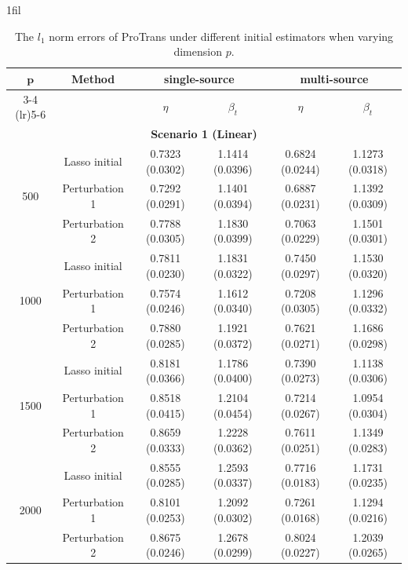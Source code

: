 \documentclass[12pt]{article}
\makeatletter
\newcommand*{\centerfloat}{%
  \parindent \z@
  \leftskip \z@ \@plus 1fil \@minus \marginparwidth
  \rightskip \leftskip
  \parfillskip \z@skip}
\makeatother
\begin{document}
\begin{table}[!ht]
\renewcommand{\arraystretch}{0.6}
\footnotesize
\centerfloat
\caption{The $l_1$ norm errors of ProTrans under different initial estimators when varying dimension $p$.}
\label{tab:our_only_vary_p_l1}
    \begin{tabular}{cccccc}
        \toprule
        \multirow{2}{*}{$\bm{p}$} & \multirow{2}{*}{\textbf{Method}} & \multicolumn{2}{c}{\textbf{single-source}} & \multicolumn{2}{c}{\textbf{multi-source}}\\
        \cmidrule(lr){3-4} \cmidrule(lr){5-6} 
        & & $\eta$ & $\beta_{t}$ & $\eta$& $\beta_{t}$ \\
        \midrule
        \multicolumn{6}{c}{\textbf{Scenario 1 (Linear)}}\\
        \hline
        \multirow{3}{*}{500} 
        & Lasso initial & 0.7323 (0.0302) &1.1414 (0.0396) &0.6824 (0.0244) &1.1273 (0.0318) \\ 
        & Perturbation 1 & 0.7292 (0.0291) & 1.1401 (0.0394) & 0.6887 (0.0231) & 1.1392 (0.0309) \\
        & Perturbation 2  & 0.7788 (0.0305)  & 1.1830 (0.0399) & 0.7063 (0.0229) & 1.1501 (0.0301) \\
        \hline
        \multirow{3}{*}{1000} 
        & Lasso initial &0.7811 (0.0230)& 1.1831 (0.0322)& 0.7450 (0.0297) & 1.1530 (0.0320) \\ 
        & Perturbation 1  & 0.7574 (0.0246) & 1.1612 (0.0340)  & 0.7208 (0.0305) & 1.1296 (0.0332) \\
        & Perturbation 2   & 0.7880 (0.0285)  & 1.1921 (0.0372) & 0.7621 (0.0271) & 1.1686 (0.0298) \\
        \hline
        \multirow{3}{*}{1500} 
        & Lasso initial &0.8181 (0.0366) &1.1786 (0.0400) &0.7390 (0.0273) &1.1138 (0.0306) \\ 
        & Perturbation 1  & 0.8518 (0.0415) & 1.2104 (0.0454) & 0.7214 (0.0267)& 1.0954 (0.0304) \\
        & Perturbation 2   & 0.8659 (0.0333) & 1.2228 (0.0362) & 0.7611 (0.0251) & 1.1349 (0.0283) \\
        \hline
        \multirow{3}{*}{2000} 
        & Lasso initial &0.8555 (0.0285) &1.2593 (0.0337) &0.7716 (0.0183) &1.1731 (0.0235) \\ 
        & Perturbation 1 & 0.8101 (0.0253) & 1.2092 (0.0302) & 0.7261 (0.0168) & 1.1294 (0.0216) \\ 
        & Perturbation 2  & 0.8675 (0.0246)& 1.2678 (0.0299) & 0.8024 (0.0227) & 1.2039 (0.0265) \\

\end{tabular}
\end{table}
\end{document}
